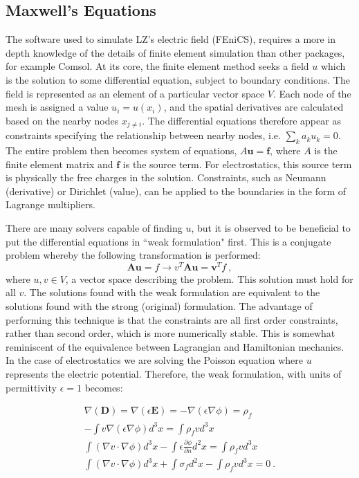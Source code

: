 \subsection{Maxwell's Equations}
The software used to simulate LZ's electric field (FEniCS\cite{alnaes_fenics_2015}), requires a more in depth knowledge of the details of finite element simulation than other packages, for example Comsol.
At its core, the finite element method seeks a field $u$ which is the solution to some differential equation, subject to boundary conditions.
The field is represented as an element of a particular vector space $V$.
Each node of the mesh is assigned a value $u_i = u(x_i)$, and the spatial derivatives are calculated based on the nearby nodes $x_{j\neq i}$.
The differential equations therefore appear as constraints specifying the relationship between nearby nodes, i.e. $\sum_k a_k u_k =0$.
The entire problem then becomes system of equations, $A\mathbf{u} = \mathbf{f}$, where $A$ is the finite element matrix and $\mathbf{f}$ is the source term.
For electrostatics, this source term is physically the free charges in the solution.
Constraints, such as Neumann (derivative) or Dirichlet (value), can be applied to the boundaries in the form of Lagrange multipliers.

There are many solvers capable of finding $u$, but it is observed to be beneficial to put the differential equations in ``weak formulation" first\cite{singh_short_2010}.
This is a conjugate problem whereby the following transformation is performed:
\begin{equation}
     \boldsymbol A  \boldsymbol u = f \rightarrow v^T \boldsymbol A \boldsymbol u =  \boldsymbol v^T f~,
\end{equation}
\noindent
where $u,v \in V$, a vector space describing the problem.
This solution must hold for all $v$.
The solutions found with the weak formulation are equivalent to the solutions found with the strong (original) formulation.
The advantage of performing this technique is that the constraints are all first order constraints, rather than second order, which is more numerically stable.
This is somewhat reminiscent of the equivalence between Lagrangian and Hamiltonian mechanics.
In the case of electrostatics we are solving the Poisson equation where $u$ represents the electric potential.
Therefore, the weak formulation, with units of permittivity $\epsilon=1$ becomes:

\begin{align}
     \nabla (\mathbf{D}) = \nabla (\epsilon\mathbf{E}) = -\nabla(\epsilon \nabla \phi) = \rho_f \\
    -\int v \nabla(\epsilon \nabla \phi)  d^3x  = \int \rho_f v d^3x \nonumber \\
    \int (\nabla v \cdot \nabla \phi ) d^3x - \int \epsilon \frac{\partial \phi}{\partial n} d^2x= \int \rho_f v d^3x\\
    \int (\nabla v \cdot \nabla \phi ) d^3x + \int \sigma_f d^2x- \int \rho_f v d^3x=0~.
    \label{eq:weak_formulation_derivation}
\end{align}

